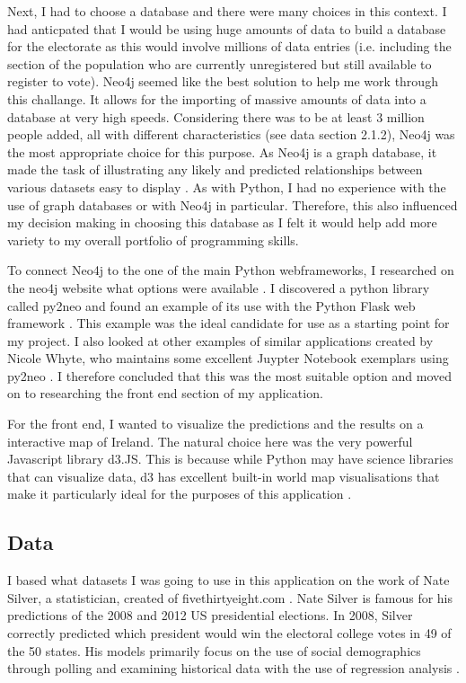 Next, I had to choose a database and there were many choices in this context. I had anticpated that I would be using huge amounts of data to build a database for the electorate as this would involve millions of data entries (i.e. including the section of the population who are currently unregistered but still available to register to vote). Neo4j seemed like the best solution to help me work through this challange. It allows for the importing of massive amounts of data into a database at very high speeds. Considering there was to be at least 3 million people added, all with different characteristics (see data section 2.1.2), Neo4j was the most appropriate choice for this purpose. As Neo4j is a graph database, it made the task of illustrating any likely and predicted relationships between various datasets easy to display \cite{neo4jreasons}. As with Python, I had no experience with the use of graph databases or with Neo4j in particular. Therefore, this also influenced my decision making in choosing this database as I felt it would help add more variety to my overall portfolio of programming skills.

To connect Neo4j to the one of the main Python webframeworks, I researched on the neo4j website what options were available \cite{neo4jpython}. I discovered a python library called py2neo and found an example of its use with the Python Flask web framework \cite{nicolewhite}. This example was the ideal candidate for use as a starting point for my project. I also looked at other examples of similar applications created by Nicole Whyte, who maintains some excellent Juypter Notebook exemplars using py2neo \cite{nicolewhitejuypter}. I
therefore concluded that this was the most suitable option and moved on to researching
the front end section of my application.

For the front end, I wanted to visualize the predictions and the results on a interactive map of Ireland. The natural choice here was the very powerful Javascript library d3.JS. This is because while Python may have science libraries that can visualize data, d3 has excellent built-in world map visualisations that make it particularly ideal for the purposes of this application \cite{d3blocks}.

\subsection{Data}
I based what datasets I was going to use in this application on the work of Nate Silver, a statistician, 
created of fivethirtyeight.com \cite{natefaq}. Nate Silver is famous for his predictions of the 2008 and 2012 US presidential elections. In 2008, Silver correctly predicted which president would win the electoral college votes in 49 of the 50 states. His models primarily focus on the use of social demographics through polling and examining historical data with the use of regression analysis \cite{bobohara}.
